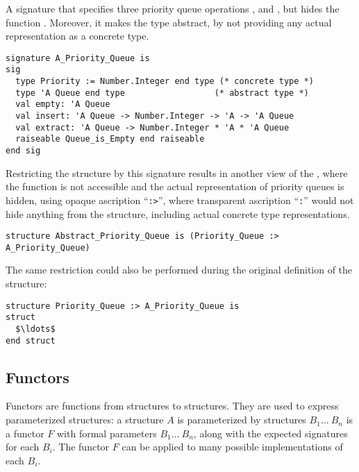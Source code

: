 \example A signature that specifies three priority queue operations ,  and , but hides the function . Moreover, it makes the  type abstract, by not providing any actual representation as a concrete type. 
\begin{lstlisting}
signature A_Priority_Queue is
sig
  type Priority := Number.Integer end type (* concrete type *)
  type 'A Queue end type                  (* abstract type *)
  val empty: 'A Queue
  val insert: 'A Queue -> Number.Integer -> 'A -> 'A Queue
  val extract: 'A Queue -> Number.Integer * 'A * 'A Queue
  raiseable Queue_is_Empty end raiseable
end sig
\end{lstlisting}
Restricting the  structure by this signature results in another view of the , where the  function is not accessible and the actual representation of priority queues is hidden, using opaque ascription ``\lstinline!:>!'', where transparent ascription ``\lstinline!:!'' would not hide anything from the structure, including actual concrete type representations. 
\begin{lstlisting}
structure Abstract_Priority_Queue is (Priority_Queue :> A_Priority_Queue)
\end{lstlisting}
The same restriction could also be performed during the original definition of the structure:
\begin{lstlisting}
structure Priority_Queue :> A_Priority_Queue is
struct 
  $\ldots$
end struct
\end{lstlisting}





\subsection{Functors}

Functors are functions from structures to structures. They are used to express parameterized structures: a structure $A$ is parameterized by structures $B_1 \ldots\ B_n$ is a functor $F$ with formal parameters $B_1 \ldots\ B_n$, along with the expected signatures for each $B_i$. The functor $F$ can be applied to many possible implementations of each $B_i$. 

